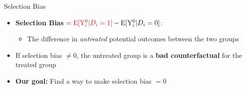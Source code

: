 \documentclass[hyperref={pdfpagelabels=false}]{beamer}
\begin{document}
\begin{frame}{Selection Bias}
	\begin{itemize}
		
     
		\item \textbf{Selection Bias} $= {\color{red}\mathrm{E}[\mathrm{Y}^{0}_{i}|D_i=1]} - \mathrm{E}[\mathrm{Y}^{0}_{i}|D_i=0]$: 
		\vspace{0.2cm}
        	\begin{itemize}
        \item The difference in \emph{untreated} potential outcomes between the two groups
		\vspace{0.1cm}
        	\end{itemize}

		\item If selection bias $\neq 0$, the untreated group is a \textbf{bad counterfactual} for the treated group
		\vspace{0.2cm}
		\item \textbf{Our goal:} Find a way to make selection bias $= 0$
	\end{itemize}
\end{frame}

\end{document}
